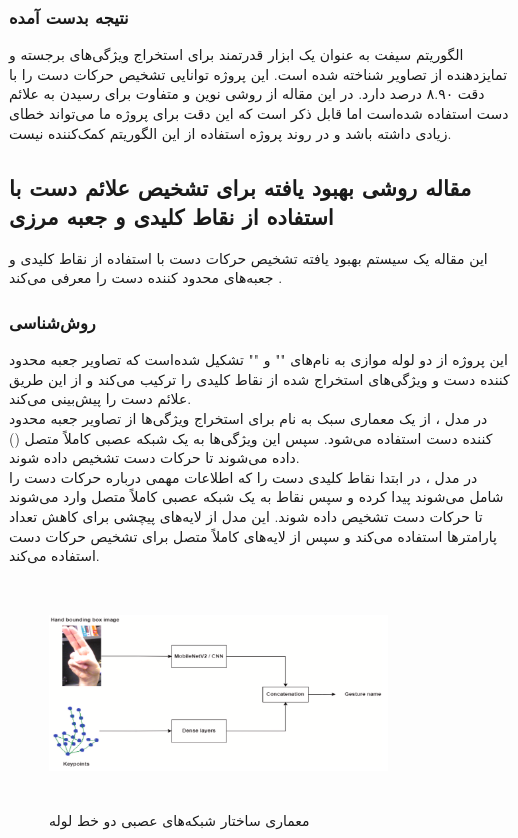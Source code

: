 \subsubsection{نتیجه بدست آمده}
الگوریتم سیفت  به عنوان یک ابزار قدرتمند برای استخراج ویژگی‌های برجسته و تمایزدهنده از تصاویر شناخته شده است. این پروژه توانایی تشخیص حرکات دست را با دقت ۸.۹۰ درصد دارد. در این مقاله از روشی نوین و متفاوت برای رسیدن به علائم دست استفاده شده‌است اما قابل ذکر است که این دقت برای پروژه ما می‌تواند خطای زیادی داشته باشد و در روند پروژه استفاده از این الگوریتم کمک‌کننده نیست.




\subsection[مقاله روشی بهبود یافته برای تشخيص علائم دست با استفاده از نقاط کلیدی و جعبه مرزی]{مقاله روشی بهبود یافته برای تشخيص علائم دست با استفاده از نقاط کلیدی و جعبه مرزی \protect{}}
این مقاله یک سیستم بهبود یافته تشخیص حرکات دست با استفاده از نقاط کلیدی و جعبه‌های محدود کننده دست را معرفی می‌کند \cite{dang2022improved}.


\subsubsection{روش‌شناسی}
این پروژه از دو لوله موازی به نام‌های "" و "" تشکیل شده‌است که تصاویر جعبه 
محدود کننده دست و ویژگی‌های استخراج شده از نقاط کلیدی را ترکیب می‌کند و از این طریق علائم دست را پیش‌بینی می‌کند. 
\\
در مدل ، از یک معماری سبک به نام  برای استخراج ویژگی‌ها از تصاویر جعبه 
محدود کننده دست استفاده می‌شود. سپس این ویژگی‌ها به یک شبکه عصبی کاملاً متصل
() داده می‌شوند تا حرکات دست تشخیص داده شوند.
\\
در مدل  ، در ابتدا نقاط کلیدی دست را که اطلاعات مهمی درباره حرکات دست را شامل می‌شوند پیدا کرده و سپس نقاط به یک شبکه عصبی کاملاً متصل وارد می‌شوند تا حرکات دست
تشخیص داده شوند. این مدل از لایه‌های پیچشی برای کاهش تعداد پارامترها استفاده می‌کند و سپس از لایه‌های کاملاً متصل برای تشخیص حرکات دست استفاده می‌کند.

\begin{figure}[h]
    \centering
    \includegraphics[height=6cm,width=0.8\textwidth]{keypoints_boundingBox.png}
    \caption[معماری ساختار شبکه‌های عصبی دو خط لوله]{معماری ساختار شبکه‌های عصبی دو خط لوله\cite{dang2022improved}}
\end{figure}


